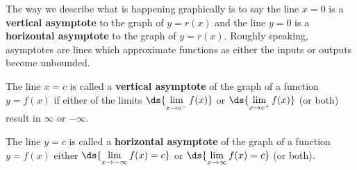 \documentclass{ximera}
\begin{document}
The way we describe what is happening graphically is to say the line $x = 0$ is a  \textbf{vertical asymptote}  to the graph of $y = r(x)$ and the line $y = 0$ is a \textbf{horizontal asymptote} to the graph of $y = r(x)$.  Roughly speaking, asymptotes are lines which approximate functions as either the inputs or outputs become unbounded. 


\begin{definition} \label{va} The line $x=c$ is called a \textbf{vertical asymptote} of the graph of a function $y=f(x)$  if either of the limits $\ds{ \lim_{x \rightarrow c^{-}} f(x)}$ or  $\ds{ \lim_{x \rightarrow c^{+}} f(x)}$ (or both) result in $\infty$ or $-\infty$.

\end{definition}

\medskip



\begin{definition} \label{ha} The line $y=c$ is called a \textbf{horizontal asymptote} of the graph of a function $y=f(x)$ either  $\ds{ \lim_{x \rightarrow -\infty} f(x)=c}$ or  $\ds{ \lim_{x \rightarrow \infty} f(x)=c}$ (or both).
\end{definition}

\medskip
\end{document}
